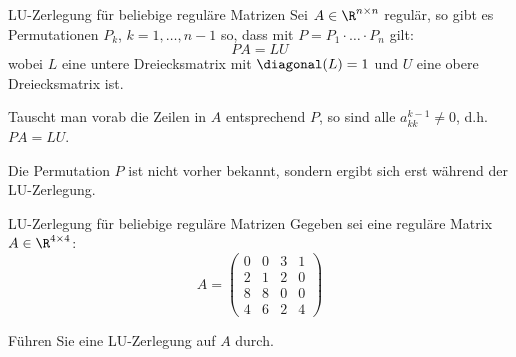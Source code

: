\begin{defi}{LU-Zerlegung für beliebige reguläre Matrizen}
    Sei $A \in \R^{n \times n}$ regulär, so gibt es Permutationen $P_k$, $k = 1, \ldots, n-1$ so, dass mit $P = P_1 \cdot \ldots \cdot P_n$ gilt:
    \[
        PA = LU
    \]
    wobei $L$ eine untere Dreiecksmatrix mit $\diagonal(L) = 1$ und $U$ eine obere Dreiecksmatrix ist.

    Tauscht man vorab die Zeilen in $A$ entsprechend $P$, so sind alle $a^{k-1}_{kk} \neq 0$, d.h. $PA = LU$.

    Die Permutation $P$ ist nicht vorher bekannt, sondern ergibt sich erst während der LU-Zerlegung.
\end{defi}

\begin{example}{LU-Zerlegung für beliebige reguläre Matrizen}
    Gegeben sei eine reguläre Matrix $A \in \R^{4 \times 4}$:
    \[
        A =
        \left(
        \begin{array}{cccc}
                0 & 0 & 3 & 1 \\
                2 & 1 & 2 & 0 \\
                8 & 8 & 0 & 0 \\
                4 & 6 & 2 & 4
            \end{array}
        \right)
    \]

    Führen Sie eine LU-Zerlegung auf $A$ durch.

    \exampleseparator


\end{example}

